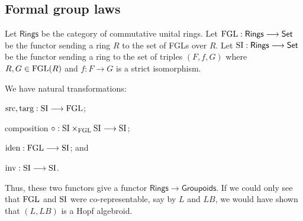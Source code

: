 \documentclass[11pt]{article}
\newcommand{\FGL}{\textup{FGL}}
\newcommand{\SI}{\textup{SI}}
\newcommand{\Ring}{\textsf{Rings}}
\begin{document}
\begin{Formal Group Laws}
\section*{Formal group laws}
Let $\Ring$ be the category of commutative unital rings. Let $\FGL:\Ring\to\Set$ be the functor sending a ring $R$ to the set of FGLs over $R$. Let $\SI:\Ring\to\Set$ be the functor sending a ring to the set of triples $(F,f,G)$ where $R,G\in\FGL(R)$ and $f:F\to G$ is a strict isomorphism.

We have natural transformations:
\begin{itemise}
\item $\textup{src},\textup{targ}:\SI\to\FGL$;
\item composition $\circ:\SI\times_\FGL\SI\to \SI$;
\item $\textup{iden}:\FGL\to\SI$; and
\item $\textup{inv}:\SI\to\SI$.
\end{itemise}
Thus, these two functors give a functor $\Ring\to\mathsf{Groupoids}$. If we could only see that $\FGL$ and $\SI$ were co-representable, say by $L$ and $LB$, we would have shown that $(L,LB)$ is a Hopf algebroid.


\end{Formal Group Laws}
\end{document}
